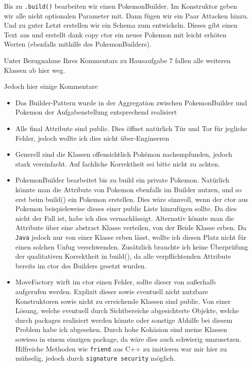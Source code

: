 \documentclass{article}
\begin{document}
\begin{enumerate}[label=\alph*.]
            Bis zu \texttt{.build()} bearbeiten wir einen PokemonBuilder.
            Im Konstruktor geben wir alle nicht optionalen Parameter mit.
            Dann fügen wir ein Paar Attacken hinzu.
            Und zu guter Letzt erstellen wir ein Schema zum entwickeln.
            Dieses gibt einen Text aus und erstellt dank copy ctor ein neues Pokemon mit leicht erhöten Werten (ebenfalls mithilfe des PokemonBuilders).
    
            \newpage
            Unter Bezugnahme Ihres Kommentars zu Hausaufgabe 7 fallen alle weiteren Klassen ab hier weg.

            Jedoch hier einige Kommentare
            \begin{itemize}
                \item Das Builder-Pattern wurde in der Aggregation zwischen PokemonBuilder und Pokemon der Aufgabenstellung entsprechend realisiert
                \item Alle final Attribute sind public.
                    Dies öffnet natürlich Tür und Tor für jegliche Fehler, jedoch wollte ich dies nicht über-Engineeren
                \item Generell sind die Klassen offensichtlich Pokémon\texttrademark\hspace{0.1ex} nachempfunden, jedoch stark vereinfacht.
                    Auf fachliche Korrektheit sei bitte nicht zu achten.
                \item PokemonBuilder bearbeitet bis zu build ein private Pokemon.
                    Natürlich könnte man die Attribute von Pokemon ebenfalls im Builder nutzen, und so erst beim build() ein Pokemon erstellen.
                    Dies wäre sinnvoll, wenn der ctor aus Pokemon beispielsweise dieses einer public Liste hinzufügen sollte.
                    Da dies nicht der Fall ist, habe ich dies vernachlässigt.
                    Alternativ könnte man die Attribute über eine abstract Klasse verteilen, von der Beide Klasse erben.
                    Da \texttt{Java} jedoch nur von einer Klasse erben lässt, wollte ich diesen Platz nicht für einen solchen Unfug verschwenden.
                    Zusätzlich brauchte ich keine Überprüfung der qualitativen Korrektheit in build(), da alle verpflichtenden Attribute bereits im ctor des Builders gesetzt wurden.
                \item MoveFactory wirft im ctor einen Fehler, sollte dieser von außerhalb aufgerufen werden.
                    Explizit dieser sowie eventuell nicht nutzbare Konstruktoren sowie nicht zu erreichende Klassen sind public.
                    Von einer Lösung, welche eventuell durch Sichtbereiche abgesichterte Objekte, welche durch packages realisiert werden könnte oder sonstige Abhilfe bei diesem Problem habe ich abgesehen.
                    Durch hohe Kohäsion sind meine Klassen sowieso in einem einzigen package, da wäre dies auch schwierig umzusetzen.
                    Hilfreiche Methoden wie \texttt{friend} aus C++ zu imitieren war mir hier zu mühselig, jedoch durch \texttt{signature security} möglich.
            \end{itemize}


\end{enumerate}
\end{document}
